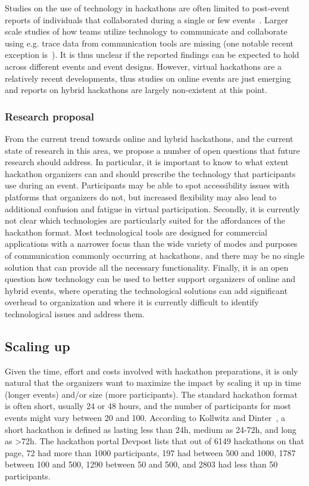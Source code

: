 \documentclass{ieeeaccess}
\begin{document}
Studies on the use of technology in hackathons are often limited to post-event reports of individuals that collaborated during a single or few events~\cite{bertello2022open,mendes2022socio}. 
Larger scale studies of how teams utilize technology to communicate and collaborate using e.g. trace data from communication tools are missing (one notable recent exception is~\cite{schultenparticipants}). 
It is thus unclear if the reported findings can be expected to hold across different events and event designs.
However, virtual hackathons are a relatively recent developments, thus studies on online events are just emerging~\cite{bertello2022open,mendes2022socio,happonen2021systematic} and reports on hybrid hackathons are largely non-existent at this point.

\subsubsection{Research proposal}
From the current trend towards online and hybrid hackathons, and the current state of research in this area, we propose a number of open questions that future research should address. 
In particular, it is important to know to what extent hackathon organizers can and should prescribe the technology that participants use during an event. 
Participants may be able to spot accessibility issues with platforms that organizers do not, but increased flexibility may also lead to additional confusion and fatigue in virtual participation. 
Secondly, it is currently not clear which technologies are particularly suited for the affordances of the hackathon format. 
Most technological tools are designed for commercial applications with a narrower focus than the wide variety of modes and purposes of communication commonly occurring at hackathons, and there may be no single solution that can provide all the necessary functionality. 
Finally, it is an open question how technology can be used to better support organizers of online and hybrid events, where operating the technological solutions can add significant overhead to organization and where it is currently difficult to identify technological issues and address them.

\subsection{Scaling up}
Given the time, effort and costs involved with hackathon preparations, it is only natural that the organizers want to maximize the impact by scaling it up in time (longer events) and/or size (more participants). 
The standard hackathon format is often short, usually 24 or 48 hours, and the number of participants for most events might vary between 20 and 100. 
According to Kollwitz and Dinter~\cite{kollwitz2019hack}, a short hackathon is defined as lasting less than 24h, medium as 24-72h, and long as >72h. 
The hackathon portal Devpost lists that out of 6149 hackathons on that page, 72 had more than 1000 participants, 197 had between 500 and 1000, 1787 between 100 and 500, 1290 between 50 and 500, and 2803 had less than 50 participants. 
\end{document}
